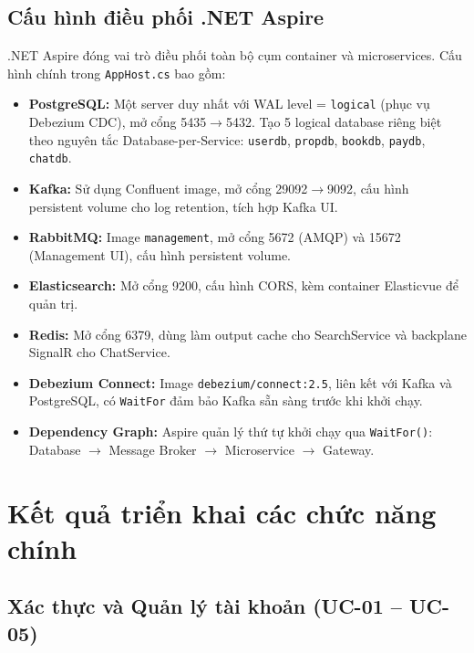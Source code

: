 \subsection{Cấu hình điều phối .NET Aspire}
\label{subsec:cau_hinh_aspire}

.NET Aspire đóng vai trò điều phối toàn bộ cụm container và microservices. Cấu hình chính trong \texttt{AppHost.cs} bao gồm:

\begin{itemize}
    \item \textbf{PostgreSQL:} Một server duy nhất với WAL level = \texttt{logical} (phục vụ Debezium CDC), mở cổng 5435$\to$5432. Tạo 5 logical database riêng biệt theo nguyên tắc Database-per-Service: \texttt{userdb}, \texttt{propdb}, \texttt{bookdb}, \texttt{paydb}, \texttt{chatdb}.

    \item \textbf{Kafka:} Sử dụng Confluent image, mở cổng 29092$\to$9092, cấu hình persistent volume cho log retention, tích hợp Kafka UI.

    \item \textbf{RabbitMQ:} Image \texttt{management}, mở cổng 5672 (AMQP) và 15672 (Management UI), cấu hình persistent volume.

    \item \textbf{Elasticsearch:} Mở cổng 9200, cấu hình CORS, kèm container Elasticvue để quản trị.

    \item \textbf{Redis:} Mở cổng 6379, dùng làm output cache cho SearchService và backplane SignalR cho ChatService.

    \item \textbf{Debezium Connect:} Image \texttt{debezium/connect:2.5}, liên kết với Kafka và PostgreSQL, có \texttt{WaitFor} đảm bảo Kafka sẵn sàng trước khi khởi chạy.

    \item \textbf{Dependency Graph:} Aspire quản lý thứ tự khởi chạy qua \texttt{WaitFor()}: Database $\to$ Message Broker $\to$ Microservice $\to$ Gateway.
\end{itemize}


\section{Kết quả triển khai các chức năng chính}
\label{sec:ket_qua_trien_khai}

\subsection{Xác thực và Quản lý tài khoản (UC-01 -- UC-05)}
\label{subsec:tk_xac_thuc}

